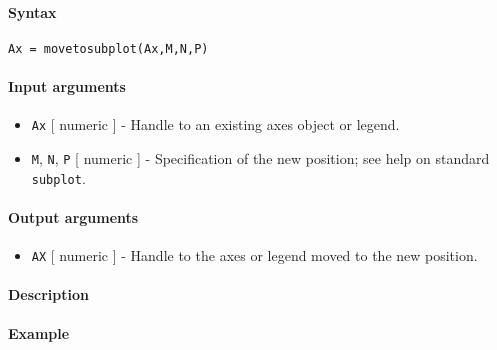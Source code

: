 


	\paragraph{Syntax}\label{syntax}

\begin{verbatim}
Ax = movetosubplot(Ax,M,N,P)
\end{verbatim}

\paragraph{Input arguments}\label{input-arguments}

\begin{itemize}
\item
  \texttt{Ax} {[} numeric {]} - Handle to an existing axes object or
  legend.
\item
  \texttt{M}, \texttt{N}, \texttt{P} {[} numeric {]} - Specification of
  the new position; see help on standard \texttt{subplot}.
\end{itemize}

\paragraph{Output arguments}\label{output-arguments}

\begin{itemize}
\itemsep1pt\parskip0pt
\item
  \texttt{AX} {[} numeric {]} - Handle to the axes or legend moved to
  the new position.
\end{itemize}

\paragraph{Description}\label{description}

\paragraph{Example}\label{example}


